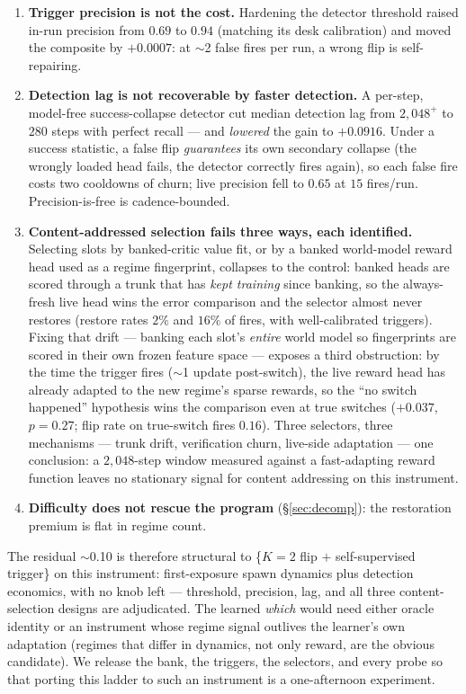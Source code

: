 \documentclass[11pt]{article}
\begin{document}
\begin{enumerate}[leftmargin=1.4em, itemsep=0.15em]
  \item \textbf{Trigger precision is not the cost.} Hardening the detector
  threshold raised in-run precision from $0.69$ to $0.94$ (matching its desk
  calibration) and moved the composite by $+0.0007$: at $\sim$2 false fires
  per run, a wrong flip is self-repairing.
  \item \textbf{Detection lag is not recoverable by faster detection.} A
  per-step, model-free success-collapse detector cut median detection lag
  from $2{,}048^{+}$ to $280$ steps with perfect recall --- and \emph{lowered}
  the gain to $+0.0916$. Under a success statistic, a false flip
  \emph{guarantees} its own secondary collapse (the wrongly loaded head
  fails, the detector correctly fires again), so each false fire costs two
  cooldowns of churn; live precision fell to $0.65$ at $15$ fires/run.
  Precision-is-free is cadence-bounded.
  \item \textbf{Content-addressed selection fails three ways, each
  identified.} Selecting slots by banked-critic value fit, or by a banked
  world-model reward head used as a regime fingerprint, collapses to the
  control: banked heads are scored through a trunk that has \emph{kept
  training} since banking, so the always-fresh live head wins the error
  comparison and the selector almost never restores (restore rates $2\%$ and
  $16\%$ of fires, with well-calibrated triggers). Fixing that drift ---
  banking each slot's \emph{entire} world model so fingerprints are scored in
  their own frozen feature space --- exposes a third obstruction: by the time
  the trigger fires ($\sim$1 update post-switch), the live reward head has
  already adapted to the new regime's sparse rewards, so the ``no switch
  happened'' hypothesis wins the comparison even at true switches
  ($+0.037$, $p{=}0.27$; flip rate on true-switch fires $0.16$). Three
  selectors, three mechanisms --- trunk drift, verification churn, live-side
  adaptation --- one conclusion: a $2{,}048$-step window measured against a
  fast-adapting reward function leaves no stationary signal for content
  addressing on this instrument.
  \item \textbf{Difficulty does not rescue the program} (\S\ref{sec:decomp}):
  the restoration premium is flat in regime count.
\end{enumerate}

The residual $\sim$0.10 is therefore structural to \{$K{=}2$ flip $+$
self-supervised trigger\} on this instrument: first-exposure spawn dynamics
plus detection economics, with no knob left --- threshold, precision, lag,
and all three content-selection designs are adjudicated. The learned
\emph{which} would need either oracle identity or an instrument whose regime
signal outlives the learner's own adaptation (regimes that differ in
dynamics, not only reward, are the obvious candidate). We release the bank,
the triggers, the selectors, and every probe so that porting this ladder to
such an instrument is a one-afternoon experiment.
\end{document}
